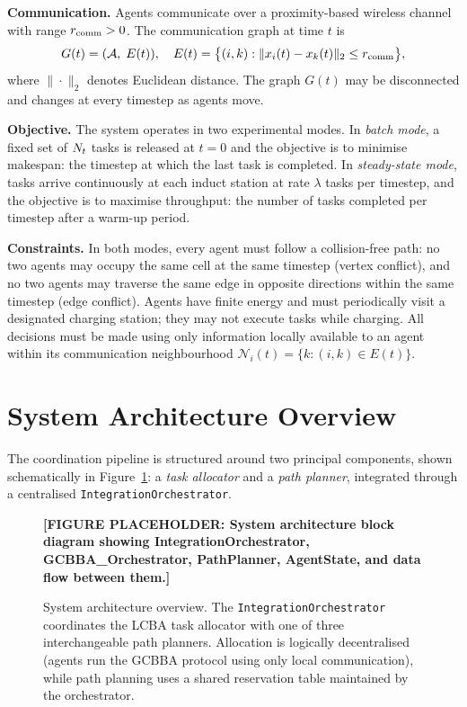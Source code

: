 \textbf{Communication.}
Agents communicate over a proximity-based wireless channel with range
$r_{\text{comm}} > 0$.
The communication graph at time $t$ is
\begin{equation}
  G(t) = (\mathcal{A},\; E(t)),
  \quad
  E(t) = \bigl\{(i,k) : \|x_i(t) - x_k(t)\|_2 \leq r_{\text{comm}}\bigr\},
  \label{eq:comm_graph}
\end{equation}
where $\|\cdot\|_2$ denotes Euclidean distance.
The graph $G(t)$ may be disconnected and changes at every timestep as agents
move.

\textbf{Objective.}
The system operates in two experimental modes.
In \emph{batch mode}, a fixed set of $N_t$ tasks is released at $t = 0$ and
the objective is to minimise makespan: the timestep at which the last task is
completed.
In \emph{steady-state mode}, tasks arrive continuously at each induct station at
rate $\lambda$ tasks per timestep, and the objective is to maximise throughput:
the number of tasks completed per timestep after a warm-up period.

\textbf{Constraints.}
In both modes, every agent must follow a collision-free path:
no two agents may occupy the same cell at the same timestep (vertex conflict),
and no two agents may traverse the same edge in opposite directions within the
same timestep (edge conflict).
Agents have finite energy and must periodically visit a designated charging
station; they may not execute tasks while charging.
All decisions must be made using only information locally available to an agent
within its communication neighbourhood $\mathcal{N}_i(t) = \{k : (i,k) \in E(t)\}$.


\section{System Architecture Overview}
\label{sec:method_overview}

The coordination pipeline is structured around two principal components, shown
schematically in Figure~\ref{fig:system_architecture}: a \emph{task allocator}
and a \emph{path planner}, integrated through a centralised
\texttt{IntegrationOrchestrator}.

\begin{figure}[htbp]
  \centering
  \textbf{[FIGURE PLACEHOLDER: System architecture block diagram showing IntegrationOrchestrator,
  GCBBA\_Orchestrator, PathPlanner, AgentState, and data flow between them.]}
  \caption{System architecture overview. The \texttt{IntegrationOrchestrator}
           coordinates the LCBA task allocator with one of three interchangeable
           path planners. Allocation is logically decentralised (agents run
           the GCBBA protocol using only local communication), while path
           planning uses a shared reservation table maintained by the
           orchestrator.}
  \label{fig:system_architecture}
\end{figure}

